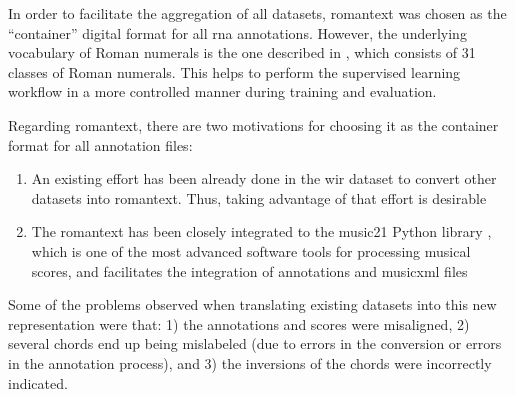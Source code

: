 
In order to facilitate the aggregation of all datasets,
\gls{romantext} was chosen as the ``container'' digital
format for all \gls{rna} annotations. However, the
underlying vocabulary of Roman numerals is the one described
in , which consists of
31 classes of Roman numerals. This helps to perform the
supervised learning workflow in a more controlled manner
during training and evaluation.

Regarding \gls{romantext}, there are two motivations for
choosing it as the container format for all annotation
files:

\begin{enumerate} 
    \item An existing effort has been already done in the
    \gls{wir} dataset
    \parencite{gotham2019romantext, gotham2022openscore}
    to convert other datasets into \gls{romantext}. Thus,
    taking advantage of that effort is desirable 
    \item The \gls{romantext} has been closely integrated to
    the music21 Python library
    \parencite{cuthbert2010music21}, which is one of the
    most advanced software tools for processing musical
    scores, and facilitates the integration of annotations
    and \gls{musicxml} files 
\end{enumerate}

Some of the problems observed when translating existing
datasets into this new representation were that: 1) the
annotations and scores were misaligned, 2) several chords
end up being mislabeled (due to errors in the conversion or
errors in the annotation process), and 3) the inversions of
the chords were incorrectly indicated.
